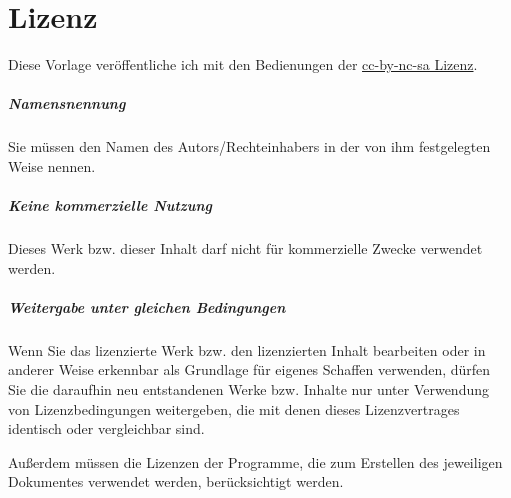 \label{sec:lizenz}
\chapter{Lizenz}

Diese Vorlage veröffentliche ich mit den Bedienungen der
\href{http://creativecommons.org/licenses/by-nc-sa/3.0/de/}{cc-by-nc-sa
Lizenz}.

\paragraph{Namensnennung} 
Sie müssen den Namen des Autors/Rechteinhabers in der von ihm festgelegten Weise nennen.

\paragraph{Keine kommerzielle Nutzung}
Dieses Werk bzw. dieser Inhalt darf nicht für kommerzielle Zwecke verwendet werden.

\paragraph{Weitergabe unter gleichen Bedingungen}
Wenn Sie das lizenzierte Werk bzw. den lizenzierten Inhalt bearbeiten oder in
anderer Weise erkennbar als Grundlage für eigenes Schaffen verwenden,
dürfen Sie die daraufhin neu entstandenen Werke bzw. Inhalte nur unter
Verwendung von Lizenzbedingungen weitergeben, die mit denen dieses
Lizenzvertrages identisch oder vergleichbar sind.

\hrulefill

Außerdem müssen die Lizenzen der Programme, 
die zum Erstellen des jeweiligen Dokumentes verwendet werden,
berücksichtigt werden.



